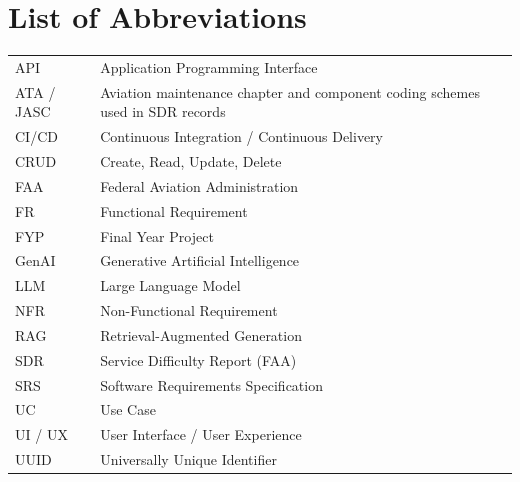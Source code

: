 \chapter*{List of Abbreviations}
\begin{tabular}{ll}
API & Application Programming Interface\\
ATA / JASC & Aviation maintenance chapter and component coding schemes used in SDR records\\
CI/CD & Continuous Integration / Continuous Delivery\\
CRUD & Create, Read, Update, Delete\\
FAA & Federal Aviation Administration\\
FR & Functional Requirement\\
FYP & Final Year Project\\
GenAI & Generative Artificial Intelligence\\
LLM & Large Language Model\\
NFR & Non-Functional Requirement\\
RAG & Retrieval-Augmented Generation\\
SDR & Service Difficulty Report (FAA)\\
SRS & Software Requirements Specification\\
UC & Use Case\\
UI / UX & User Interface / User Experience\\
UUID & Universally Unique Identifier\\
\end{tabular}
